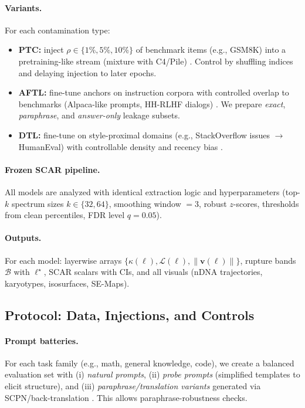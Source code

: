 \documentclass[11pt]{article}
\begin{document}
\paragraph{Variants.} For each contamination type:
\begin{itemize}
    \item \textbf{PTC:} inject $\rho\in\{1\%,5\%,10\%\}$ of benchmark items (e.g., GSM8K) into a pretraining-like stream (mixture with C4/Pile) \citep{dodge2021documenting,gao2020pile}. Control by shuffling indices and delaying injection to later epochs.
    \item \textbf{AFTL:} fine-tune anchors on instruction corpora with controlled overlap to benchmarks (Alpaca-like prompts, HH-RLHF dialogs) \citep{bai2022harmless,ouyang2022instructgpt}. We prepare \emph{exact}, \emph{paraphrase}, and \emph{answer-only} leakage subsets.
    \item \textbf{DTL:} fine-tune on style-proximal domains (e.g., StackOverflow issues \(\to\) HumanEval) with controllable density and recency bias \citep{chen2021humaneval}.
\end{itemize}

\paragraph{Frozen SCAR pipeline.} All models are analyzed with identical extraction logic and hyperparameters (top-$k$ spectrum sizes $k\in\{32,64\}$, smoothing window $=3$, robust $z$-scores, thresholds from clean percentiles, FDR level $q=0.05$).

\paragraph{Outputs.} For each model: layerwise arrays $\{\kappa(\ell),\mathcal{L}(\ell),\|\mathbf{v}(\ell)\|\}$, rupture bands $\mathcal{B}$ with $\ell^\star$, SCAR scalars with CIs, and all visuals (nDNA trajectories, karyotypes, isosurfaces, SE-Maps).

\subsection*{Protocol: Data, Injections, and Controls}
\label{subsec:protocol}
\paragraph{Prompt batteries.} For each task family (e.g., math, general knowledge, code), we create a balanced evaluation set with (i) \emph{natural prompts}, (ii) \emph{probe prompts} (simplified templates to elicit structure), and (iii) \emph{paraphrase/translation variants} generated via SCPN/back-translation \citep{iyyer2018scpn,ribeiro2020checklist}. This allows paraphrase-robustness checks.
\end{document}
